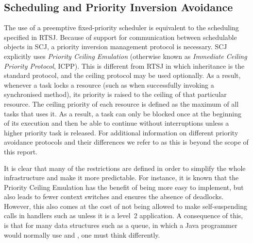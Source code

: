 \subsection{Scheduling and Priority Inversion Avoidance} %
\label{sub:scheduling_and_priority_inversion_avoidance}
The use of a preemptive fixed-priority scheduler is equivalent to the scheduling specified in RTSJ. Because of support for communication between schedulable objects in SCJ, a priority inversion management protocol is necessary. SCJ explicitly uses \textit{Priority Ceiling Emulation} (otherwise known as \textit{Immediate Ceiling Priority Protocol}, ICPP). This is different from RTSJ in which inheritance is the standard protocol, and the ceiling protocol may be used optionally. As a result, whenever a task locks a resource (such as when successfully invoking a synchronised method), its priority is raised to the ceiling of that particular resource. The ceiling priority of each resource is defined as the maximum of all tasks that uses it. As a result, a task can only be blocked once at the beginning of its execution and then be able to continue without interruptions unless a higher priority task is released. For additional information on different priority avoidance protocols and their differences we refer to \cite{alan2001real} as this is beyond the scope of this report.

It is clear that many of the restrictions are defined in order to simplify the whole infrastructure and make it more predictable. For instance, it is known that the Priority Ceiling Emulation has the benefit of being more easy to implement, but also leads to fewer context switches and ensures the absence of deadlocks\cite{alan2001real}. However, this also comes at the cost of not being allowed to make self-suspending calls in handlers such as  unless it is a level~2 application. A consequence of this, is that for many data structures such as a queue, in which a Java programmer would normally use  and , one must think differently.


